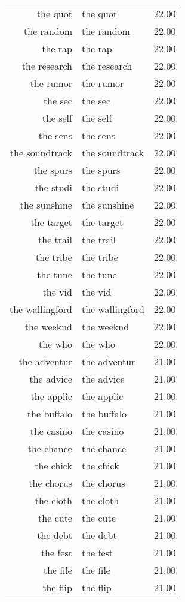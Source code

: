 \begin{table}[ht]
\begin{tabular}{rlr}
  the quot & the quot & 22.00 \\ 
  the random & the random & 22.00 \\ 
  the rap & the rap & 22.00 \\ 
  the research & the research & 22.00 \\ 
  the rumor & the rumor & 22.00 \\ 
  the sec & the sec & 22.00 \\ 
  the self & the self & 22.00 \\ 
  the sens & the sens & 22.00 \\ 
  the soundtrack & the soundtrack & 22.00 \\ 
  the spurs & the spurs & 22.00 \\ 
  the studi & the studi & 22.00 \\ 
  the sunshine & the sunshine & 22.00 \\ 
  the target & the target & 22.00 \\ 
  the trail & the trail & 22.00 \\ 
  the tribe & the tribe & 22.00 \\ 
  the tune & the tune & 22.00 \\ 
  the vid & the vid & 22.00 \\ 
  the wallingford & the wallingford & 22.00 \\ 
  the weeknd & the weeknd & 22.00 \\ 
  the who & the who & 22.00 \\ 
  the adventur & the adventur & 21.00 \\ 
  the advice & the advice & 21.00 \\ 
  the applic & the applic & 21.00 \\ 
  the buffalo & the buffalo & 21.00 \\ 
  the casino & the casino & 21.00 \\ 
  the chance & the chance & 21.00 \\ 
  the chick & the chick & 21.00 \\ 
  the chorus & the chorus & 21.00 \\ 
  the cloth & the cloth & 21.00 \\ 
  the cute & the cute & 21.00 \\ 
  the debt & the debt & 21.00 \\ 
  the fest & the fest & 21.00 \\ 
  the file & the file & 21.00 \\ 
  the flip & the flip & 21.00 \\ 

\end{tabular}
\end{table}
